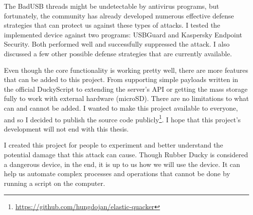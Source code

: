 The BadUSB threads might be undetectable by antivirus programs, but fortunately, the community has already developed numerous effective defense strategies that can protect us against these types of attacks. I tested the implemented device against two programs: USBGuard and Kaspersky Endpoint Security. Both performed well and successfully suppressed the attack. I also discussed a few other possible defense strategies that are currently available.

Even though the core functionality is working pretty well, there are more features that can be added to this project. From supporting simple payloads written in the official DuckyScript to extending the server's API or getting the mass storage fully to work with external hardware (microSD). There are no limitations to what can and cannot be added. I wanted to make this project available to everyone, and so I decided to publish the source code publicly\footnote{\url{https://github.com/hungdojan/elastic-quacker}}. I hope that this project's development will not end with this thesis.

I created this project for people to experiment and better understand the potential damage that this attack can cause. Though Rubber Ducky is considered a dangerous device, in the end, it is up to us how we will use the device. It can help us automate complex processes and operations that cannot be done by running a script on the computer.
